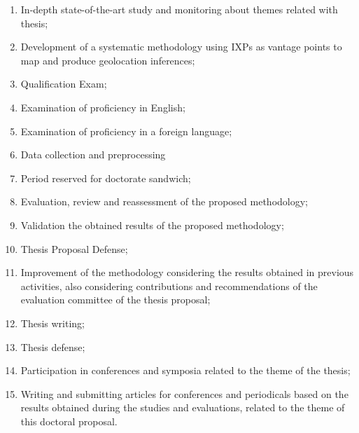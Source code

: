 \begin{enumerate}

\item In-depth state-of-the-art study and monitoring about themes related with thesis; \label{it:estado-da-arte}

\item Development of a systematic methodology using IXPs as vantage points to map and produce geolocation inferences; \label{it:modelagem}

\item Qualification Exam; \label{it:qualif}

\item Examination of proficiency in English; \label{it:english}

\item Examination of proficiency in a foreign language; \label{it:idioma}

\item Data collection and preprocessing \label{it:aval-anali}

\item Period reserved for doctorate sandwich; \label{it:sanduba}

\item Evaluation, review and reassessment of the proposed methodology; \label{it:aval-larga-escala}

\item Validation the obtained results of the proposed methodology; \label{it:proj-amb-exp}

\item Thesis Proposal Defense; \label{it:def-prop-tese}

\item Improvement of the methodology considering the results obtained in previous activities, also considering contributions and recommendations of the evaluation committee of the thesis proposal; \label{it:rev-final-modelo}

\item Thesis writing; \label{it:redacao}

\item Thesis defense; \label{it:def-tese}

\item Participation in conferences and symposia related to the theme of the thesis; \label{it:part-cong}

\item Writing and submitting articles for conferences and periodicals based on the results obtained during the studies and evaluations, related to the theme of this doctoral proposal. \label{it:submissoes}
\end{enumerate}

